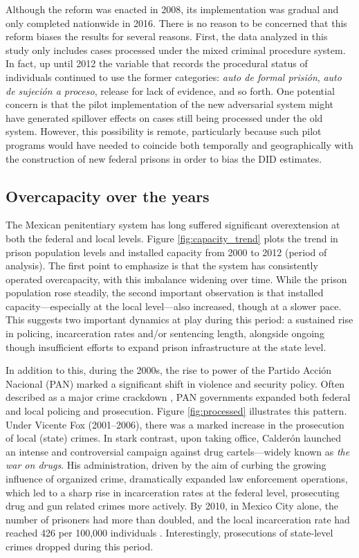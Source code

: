 Although the reform was enacted in 2008, its implementation was gradual and only completed nationwide in 2016. There is no reason to be concerned that this reform biases the results for several reasons. First, the data analyzed in this study only includes cases processed under the mixed criminal procedure system. In fact, up until 2012 the variable that records the procedural status of individuals continued to use the former categories: \textit{auto de formal prisión}, \textit{auto de sujeción a proceso}, release for lack of evidence, and so forth. One potential concern is that the pilot implementation of the new adversarial system might have generated spillover effects on cases still being processed under the old system. However, this possibility is remote, particularly because such pilot programs would have needed to coincide both temporally and geographically with the construction of new federal prisons in order to bias the DID estimates.

\subsection*{Overcapacity over the years}

The Mexican penitentiary system has long suffered significant overextension at both the federal and local levels. Figure \ref{fig:capacity_trend} plots the trend in prison population levels and installed capacity from 2000 to 2012 (period of analysis). The first point to emphasize is that the system has consistently operated overcapacity, with this imbalance widening over time. While the prison population rose steadily, the second important observation is that installed capacity—especially at the local level—also increased, though at a slower pace. This suggests two important dynamics at play during this period: a sustained rise in policing, incarceration rates and/or sentencing length, alongside ongoing though insufficient efforts to expand prison infrastructure at the state level.

In addition to this, during the 2000s, the rise to power of the Partido Acción Nacional (PAN) marked a significant shift in violence and security policy. Often described as a major crime crackdown \citep{DellMexicanDrug, AnnualReviewPoliSci}, PAN governments expanded both federal and local policing and prosecution. Figure \ref{fig:processed} illustrates this pattern. Under Vicente Fox (2001–2006), there was a marked increase in the prosecution of local (state) crimes. In stark contrast, upon taking office, Calderón launched an intense and controversial campaign against drug cartels—widely known as \textit{the war on drugs}. His administration, driven by the aim of curbing the growing influence of organized crime, dramatically expanded law enforcement operations, which led to a sharp rise in incarceration rates at the federal level, prosecuting drug and gun related crimes more actively. By 2010, in Mexico City alone, the number of prisoners had more than doubled, and the local incarceration rate had reached 426 per 100,000 individuals \citep{SSP}. Interestingly, prosecutions of state-level crimes dropped during this period.

